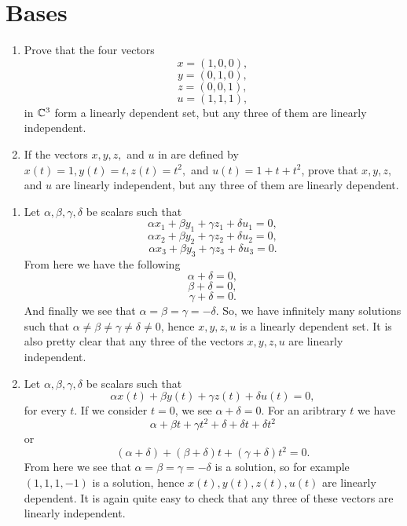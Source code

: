 \section{Bases}


\begin{problem}
  \begin{enumerate}[label=[\alph*]]
    \item Prove that the four vectors
      \[x = (1, 0, 0),\]
      \[y = (0, 1, 0),\]
      \[z = (0, 0, 1),\]
      \[u = (1, 1, 1),\]
      in $\mathbb{C}^3$ form a linearly dependent set, but any three of them are linearly independent.
    \item If the vectors $x, y, z,$ and $u$ in  are defined by $x(t) = 1, y(t) = t, z(t) = t^2,$ and $u(t) = 1 + t + t^2$, prove that $x, y, z,$ and $u$ are linearly independent, but any three of them are linearly dependent.
  \end{enumerate}
\end{problem}

\begin{solution}
  \begin{enumerate}[label=[\alph*]]
    \item Let $\alpha, \beta, \gamma, \delta$ be scalars such that
      \[\alpha x_1 + \beta y_1 + \gamma z_1 + \delta u_1 = 0,\]
      \[\alpha x_2 + \beta y_2 + \gamma z_2 + \delta u_2 = 0,\]
      \[\alpha x_3 + \beta y_3 + \gamma z_3 + \delta u_3 = 0.\]
      From here we have the following
      \[\alpha + \delta = 0,\]
      \[\beta + \delta = 0,\]
      \[\gamma + \delta = 0.\]
      And finally we see that $\alpha = \beta = \gamma = -\delta$.
      So, we have infinitely many solutions such that $\alpha \neq \beta \neq \gamma \neq \delta \neq 0$, hence $x, y, z, u$ is a linearly dependent set.
      It is also pretty clear that any three of the vectors $x, y, z, u$ are linearly independent.
    \item Let $\alpha, \beta, \gamma, \delta$ be scalars such that
      \[\alpha x(t) + \beta y(t) + \gamma z(t) + \delta u(t) = 0,\]
      for every $t$.
      If we consider $t = 0$, we see $\alpha + \delta = 0$.
      For an aribtrary $t$ we have
      \[\alpha + \beta t + \gamma t^2 + \delta + \delta t + \delta t^2\]
      or
      \[(\alpha + \delta) + (\beta + \delta)t + (\gamma + \delta)t^2 = 0.\]
      From here we see that $\alpha = \beta = \gamma = -\delta$ is a solution, so for example $(1, 1, 1, -1)$ is a solution, hence $x(t), y(t), z(t), u(t)$ are linearly dependent.
      It is again quite easy to check that any three of these vectors are linearly independent.
  \end{enumerate}
\end{solution}


